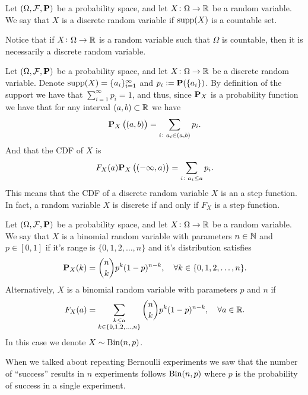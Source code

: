 \documentclass[11pt,a4paper]{article}
\begin{document}
  \begin{definition}
    Let $(\Omega ,\mathcal F, \mathbf{P})$ be a probability space,
    and let $X \colon \Omega \to \mathbb{R}$ be a random variable.
    We say that $X$ is a discrete random variable if $\operatorname{supp}(X)$ is a 
    countable set.
  \end{definition}
  \begin{remark}
    Notice that if $X \colon \Omega \to \mathbb{R}$ is a random variable such
    that $\Omega$ is countable, then it is necessarily a discrete random
    variable.
  \end{remark}
  \begin{remark}
    Let $(\Omega ,\mathcal F, \mathbf{P})$ be a probability space,
    and let $X \colon \Omega \to \mathbb{R}$ be a discrete random variable.
    Denote $\operatorname{supp}(X) = \{a_i\}_{i=1}^{\infty}$ and $p_i := \mathbf{P}(\{a_i\})$.
    By definition of the support we have that $\sum_{i=1}^{\infty} p_i = 1$,
    and thus, since $\mathbf{P}_X$ is a probability function we have that
    for any interval $(a,b) \subset \mathbb{R}$ we have
    \[
      \mathbf{P}_X \left((a,b)\right) = \sum_{i \colon a_i \in (a,b)} p_i.
    \]
    And that the CDF of $X$ is
    \[
      F_X(a)
      \mathbf{P}_X \left((-\infty,a)\right) = \sum_{i \colon a_i \le a} p_i.
    \]
    This means that the CDF of a discrete random variable $X$ is an a step
    function. In fact, a random variable $X$ is discrete if and only if
    $F_X$ is a step function.
  \end{remark}

  \begin{definition}
    Let $(\Omega ,\mathcal F, \mathbf{P})$ be a probability space,
    and let $X \colon \Omega \to \mathbb{R}$ be a random variable.
    We say that $X$ is a binomial random variable with parameters
    $n \in \mathbb{N}$ and $p \in [0,1]$ if it's range is $\{0,1,2,\dots,n\}$ and
    it's distribution satisfies
    \[
      \mathbf{P}_X(k) = \binom{n}{k} p^k (1-p)^{n-k}, \quad 
      \forall k \in \{0,1,2,\dots,n\}.
    \]
    Alternatively, $X$ is a binomial random variable with parameters
    $p$ and $n$ if
    \[
      F_X(a) = \sum_{\substack{k \le a \\ k \in \{0,1,2,\dots,n\}}}
      \binom{n}{k} p^k (1-p)^{n-k}, \quad \forall a \in \mathbb{R}.
    \]
    In this case we denote $X \sim \operatorname{Bin}(n,p)$.
  \end{definition}
  When we talked about repeating Bernoulli experiments we saw that the number
  of ``success'' results in $n$ experiments follows $\operatorname{Bin}(n,p)$ where
  $p$ is the probability of success in a single experiment.
  
\end{document}
